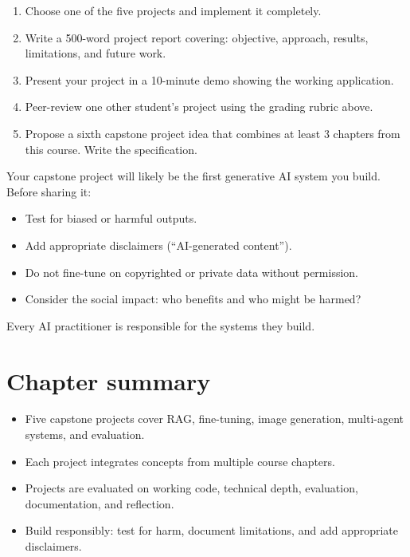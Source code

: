 \begin{exercise}
\begin{enumerate}
  \item Choose one of the five projects and implement it completely.
  \item Write a 500-word project report covering: objective, approach, results, limitations, and future work.
  \item Present your project in a 10-minute demo showing the working application.
  \item Peer-review one other student's project using the grading rubric above.
  \item Propose a sixth capstone project idea that combines at least 3 chapters from this course. Write the specification.
\end{enumerate}
\end{exercise}

\begin{ethicsbox}
Your capstone project will likely be the first generative AI system you build. Before sharing it:
\begin{itemize}
  \item Test for biased or harmful outputs.
  \item Add appropriate disclaimers (``AI-generated content'').
  \item Do not fine-tune on copyrighted or private data without permission.
  \item Consider the social impact: who benefits and who might be harmed?
\end{itemize}
Every AI practitioner is responsible for the systems they build.
\end{ethicsbox}

\section{Chapter summary}

\begin{itemize}
  \item Five capstone projects cover RAG, fine-tuning, image generation, multi-agent systems, and evaluation.
  \item Each project integrates concepts from multiple course chapters.
  \item Projects are evaluated on working code, technical depth, evaluation, documentation, and reflection.
  \item Build responsibly: test for harm, document limitations, and add appropriate disclaimers.
\end{itemize}
